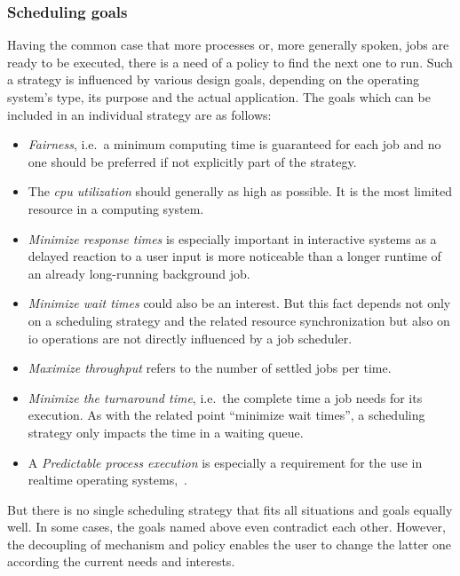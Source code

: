 \subsubsection*{Scheduling goals}
Having the common case that more processes or, more generally spoken, jobs are ready to be executed, there is a need of a policy to find the next one to run.
Such a strategy is influenced by various design goals, depending on the operating system's type, its purpose and the actual application\cite{mandl2014Grundkurs}.
The goals which can be included in an individual strategy are as follows:
\begin{itemize}
    \item \textit{Fairness}, i.e.\ a minimum computing time is guaranteed for each job and no one should be preferred if not explicitly part of the strategy.
    \item The \textit{\ac{cpu} utilization} should generally as high as possible. It is the most limited resource in a computing system.
    \item \textit{Minimize response times} is especially important in interactive systems as a delayed reaction to a user input is more noticeable than a longer runtime of an already long-running background job.
    \item \textit{Minimize wait times} could also be an interest. But this fact depends not only on a scheduling strategy and the related resource synchronization but also on \ac{io} operations are not directly influenced by a job scheduler. 
    \item \textit{Maximize throughput} refers to the number of settled jobs per time.
    \item \textit{Minimize the turnaround time}, i.e.\ the complete time a job needs for its execution. As with the related point ``minimize wait times'', a scheduling strategy only impacts the time in a waiting queue.
    \item A \textit{Predictable process execution} is especially a requirement for the use in realtime operating systems\cite{mandl2014Grundkurs},~\cite{brause2017betriebssysteme}. 
\end{itemize}
But there is no single scheduling strategy that fits all situations and goals equally well.
In some cases, the goals named above even contradict each other.
However, the decoupling of mechanism and policy enables the user to change the latter one according the current needs and interests\cite{brause2017betriebssysteme}.

